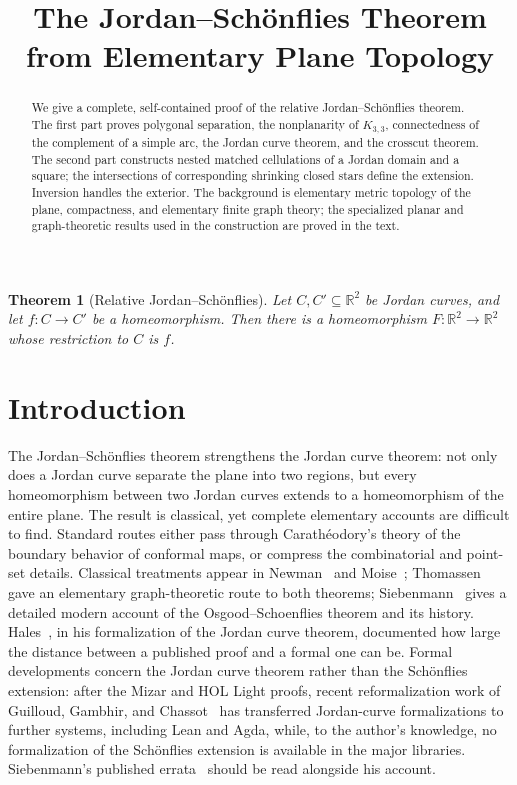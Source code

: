 \documentclass[11pt]{article}
\title{The Jordan--Schönflies Theorem\\from Elementary Plane Topology}
\author{}\date{}
\theoremstyle{mainplain}
\newtheorem{theorem}{Theorem}[section]
\theoremstyle{mainroman}
\theoremstyle{definition}
\numberwithin{equation}{section}
\begin{document}
\maketitle\vspace{-2.2em}
\begin{abstract}
We give a complete, self-contained proof of the relative Jordan--Schönflies theorem. The first part proves polygonal separation, the nonplanarity of $K_{3,3}$, connectedness of the complement of a simple arc, the Jordan curve theorem, and the crosscut theorem. The second part constructs nested matched cellulations of a Jordan domain and a square; the intersections of corresponding shrinking closed stars define the extension. Inversion handles the exterior. The background is elementary metric topology of the plane, compactness, and elementary finite graph theory; the specialized planar and graph-theoretic results used in the construction are proved in the text.
\end{abstract}
\begin{theorem}[Relative Jordan--Schönflies]\label{thm:main}
Let $C,C'\subseteq\mathbb R^2$ be Jordan curves, and let $f:C\to C'$ be a homeomorphism.  Then there is a homeomorphism $F:\mathbb R^2\to\mathbb R^2$ whose restriction to $C$ is $f$.
\end{theorem}
\tableofcontents\clearpage

\section*{Introduction}

The Jordan--Schönflies theorem strengthens the Jordan curve theorem:
not only does a Jordan curve separate the plane into two regions, but
every homeomorphism between two Jordan curves extends to a
homeomorphism of the entire plane. The result is classical, yet
complete elementary accounts are difficult to find. Standard routes
either pass through Carathéodory's theory of the boundary behavior of
conformal maps, or compress the combinatorial and point-set details.
Classical treatments appear in Newman~\cite{Newman} and
Moise~\cite{Moise}; Thomassen~\cite{Thomassen} gave an elementary
graph-theoretic route to both theorems; Siebenmann~\cite{Siebenmann}
gives a detailed modern account of the Osgood--Schoenflies theorem and
its history. Hales~\cite{Hales}, in his formalization of the Jordan
curve theorem, documented how large the distance between a published
proof and a formal one can be. Formal developments concern the Jordan
curve theorem rather than the Schönflies extension: after the Mizar
and HOL Light proofs, recent reformalization work of Guilloud, Gambhir, and
Chassot~\cite{GuilloudGambhirChassot} has transferred Jordan-curve
formalizations to further systems, including Lean and Agda, while, to
the author's knowledge, no formalization of the Schönflies extension
is available in the major libraries. Siebenmann's published
errata~\cite{SiebenmannErrata} should be read alongside his account.
\end{document}
